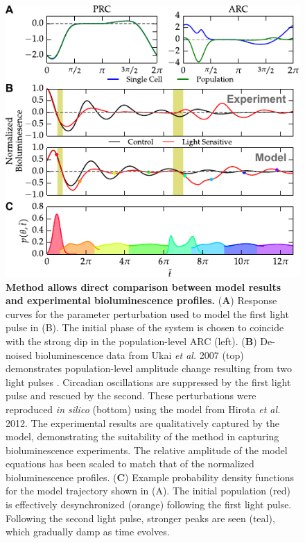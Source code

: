 \documentclass[11pt, letterpaper]{article}
\begin{document}
\begin{figure}[tbp]
  \begin{center}
    \includegraphics[width=.75\textwidth]{figures/figure_5.pdf}
    \caption{
{\bfseries Method allows direct comparison between model results and experimental bioluminescence profiles.} 
({\bfseries A}) Response curves for the parameter perturbation used to model the first light pulse in (B).
The initial phase of the system is chosen to coincide with the strong dip in the population-level ARC (left).
({\bfseries B}) De-noised bioluminescence data from Ukai {\itshape et al.} 2007 (top) demonstrates population-level amplitude change resulting from two light pulses \cite{Ukai2007}.
Circadian oscillations are suppressed by the first light pulse and rescued by the second.
These perturbations were reproduced {\itshape in silico} (bottom) using the model from Hirota {\itshape et al.} 2012.
The experimental results are qualitatively captured by the model, demonstrating the suitability of the method in capturing bioluminescence experiments.
The relative amplitude of the model equations has been scaled to match that of the normalized bioluminescence profiles.
({\bfseries C}) Example probability density functions for the model trajectory shown in (A).
 The initial population (red) is effectively desynchronized (orange) following the first light pulse.
Following the second light pulse, stronger peaks are seen (teal), which gradually damp as time evolves.} \end{center}
\end{figure}
\end{document}
